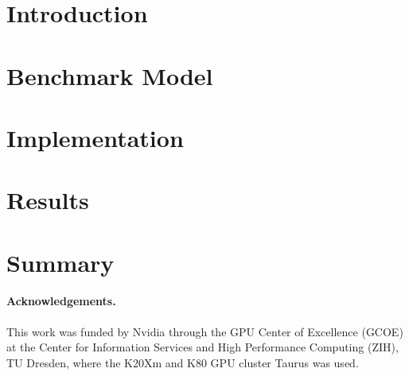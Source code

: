 \documentclass{llncs}
\begin{document}

\section{Introduction}
\label{sec:intro}



\section{Benchmark Model}
\label{sec:benchmark_model}


\section{Implementation}
\label{sec:implementation}


\clearpage
\section{Results}
\label{sec:results}


\section{Summary}
\label{sec:summary}


\paragraph{Acknowledgements.} This work was funded by Nvidia through the GPU Center of Excellence (GCOE) at the Center for Information Services and High Performance Computing (ZIH), TU Dresden, where the K20Xm and K80 GPU cluster Taurus was used.

\printbibliography
\end{document}
